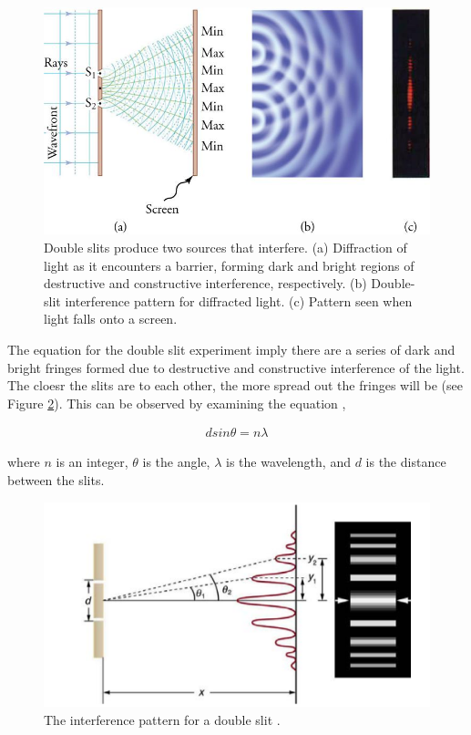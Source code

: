 \documentclass[12pt]{article}
\begin{document}
\begin{figure}[H]
    \centering
    \includegraphics[width=.7\textwidth]{diffraction pattern.jpg}
    \caption{ Double slits produce two sources that interfere. (a) Diffraction of light as it encounters a barrier, forming dark and bright regions of destructive and constructive interference, respectively.
    (b) Double-slit interference pattern for diffracted light. (c) Pattern seen when light falls onto a screen. \protect\cite{urone2012collegedouble}}
    \label{fig:1}
\end{figure}

The equation for the double slit experiment imply there are a series of dark and bright fringes formed due to destructive and constructive interference of the light. The cloesr the slits are to each other, the more spread out the fringes will be (see Figure \ref{fig:3}).
This can be observed by examining the equation \cite{urone2012collegedouble},

\vspace{-2ex}
\begin{gather} \label{eq:3}
    d sin \theta = n \lambda
\end{gather}

where $n$ is an integer, $\theta$ is the angle, $\lambda$ is the wavelength, and $d$ is the distance between the slits.

\begin{figure}[H]
    \centering
    \includegraphics[width=.7\textwidth]{youngs slit.png}
    \caption{\centering The interference pattern for a double slit \protect\cite{urone2012collegedouble}.}
    \label{fig:3}
\end{figure}
\end{document}
